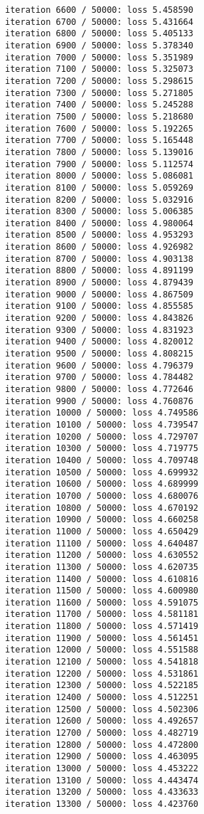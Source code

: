\documentclass[11pt]{article}
\begin{document}
\begin{Verbatim}[commandchars=\\\{\}]
iteration 6600 / 50000: loss 5.458590
iteration 6700 / 50000: loss 5.431664
iteration 6800 / 50000: loss 5.405133
iteration 6900 / 50000: loss 5.378340
iteration 7000 / 50000: loss 5.351989
iteration 7100 / 50000: loss 5.325073
iteration 7200 / 50000: loss 5.298615
iteration 7300 / 50000: loss 5.271805
iteration 7400 / 50000: loss 5.245288
iteration 7500 / 50000: loss 5.218680
iteration 7600 / 50000: loss 5.192265
iteration 7700 / 50000: loss 5.165448
iteration 7800 / 50000: loss 5.139016
iteration 7900 / 50000: loss 5.112574
iteration 8000 / 50000: loss 5.086081
iteration 8100 / 50000: loss 5.059269
iteration 8200 / 50000: loss 5.032916
iteration 8300 / 50000: loss 5.006385
iteration 8400 / 50000: loss 4.980064
iteration 8500 / 50000: loss 4.953293
iteration 8600 / 50000: loss 4.926982
iteration 8700 / 50000: loss 4.903138
iteration 8800 / 50000: loss 4.891199
iteration 8900 / 50000: loss 4.879439
iteration 9000 / 50000: loss 4.867509
iteration 9100 / 50000: loss 4.855585
iteration 9200 / 50000: loss 4.843826
iteration 9300 / 50000: loss 4.831923
iteration 9400 / 50000: loss 4.820012
iteration 9500 / 50000: loss 4.808215
iteration 9600 / 50000: loss 4.796379
iteration 9700 / 50000: loss 4.784482
iteration 9800 / 50000: loss 4.772646
iteration 9900 / 50000: loss 4.760876
iteration 10000 / 50000: loss 4.749586
iteration 10100 / 50000: loss 4.739547
iteration 10200 / 50000: loss 4.729707
iteration 10300 / 50000: loss 4.719775
iteration 10400 / 50000: loss 4.709748
iteration 10500 / 50000: loss 4.699932
iteration 10600 / 50000: loss 4.689999
iteration 10700 / 50000: loss 4.680076
iteration 10800 / 50000: loss 4.670192
iteration 10900 / 50000: loss 4.660258
iteration 11000 / 50000: loss 4.650429
iteration 11100 / 50000: loss 4.640487
iteration 11200 / 50000: loss 4.630552
iteration 11300 / 50000: loss 4.620735
iteration 11400 / 50000: loss 4.610816
iteration 11500 / 50000: loss 4.600980
iteration 11600 / 50000: loss 4.591075
iteration 11700 / 50000: loss 4.581181
iteration 11800 / 50000: loss 4.571419
iteration 11900 / 50000: loss 4.561451
iteration 12000 / 50000: loss 4.551588
iteration 12100 / 50000: loss 4.541818
iteration 12200 / 50000: loss 4.531861
iteration 12300 / 50000: loss 4.522185
iteration 12400 / 50000: loss 4.512251
iteration 12500 / 50000: loss 4.502306
iteration 12600 / 50000: loss 4.492657
iteration 12700 / 50000: loss 4.482719
iteration 12800 / 50000: loss 4.472800
iteration 12900 / 50000: loss 4.463095
iteration 13000 / 50000: loss 4.453222
iteration 13100 / 50000: loss 4.443474
iteration 13200 / 50000: loss 4.433633
iteration 13300 / 50000: loss 4.423760

\end{Verbatim}
\end{document}
